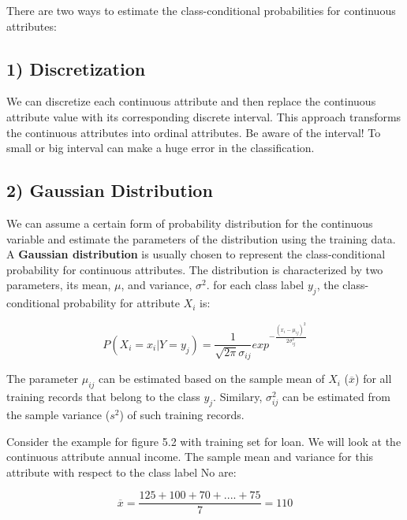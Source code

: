 			There are two ways to estimate the class-conditional probabilities for 
			continuous attributes:

			\subsection*{1) Discretization}

				We can discretize each continuous attribute and then replace the continuous
				attribute value with its corresponding discrete interval. This approach
				transforms the continuous attributes into ordinal attributes. 
				Be aware of the interval! To small or big interval can make a huge error in
				the classification. 

			\subsection*{2) Gaussian Distribution}

				We can assume a certain form of probability distribution for the continuous
				variable and estimate the parameters of the distribution using the training data. 
				A {\bf Gaussian distribution} is usually chosen to represent the class-conditional
				probability for continuous attributes. The distribution is characterized by two 
				parameters, its mean, $\mu$, and variance, $\sigma^{2}$.
				for each class label $y_{j}$, the class-conditional probability for attribute $X_{i}$ is:

				\begin{equation}
					P(X_{i} = x_{i}|Y = y_{j}) = \frac{1}{\sqrt{2\pi} \sigma_{ij}} 
					exp^{-\frac{(x_{i}-\mu_{ij})^{2}}{2\sigma^{2}_{ij}}}
				\end{equation} 

				The parameter $\mu_{ij}$ can be estimated based on the sample mean of $X_{i}$ 
				($\overline{x}$) for all training records that belong to the class $y_{j}$.
				Similary, $\sigma^{2}_{ij}$ can be estimated from the sample variance ($s^{2}$)
				of such training records. 

				Consider the example for figure 5.2 with training set for loan. We will look at the
				continuous attribute annual income.  
				The sample mean and variance for this attribute with respect to the class label No
				are:

				\begin{equation}
					\overline{x} = \frac{125 + 100 + 70 + .... + 75}{7} =110
				\end{equation}

